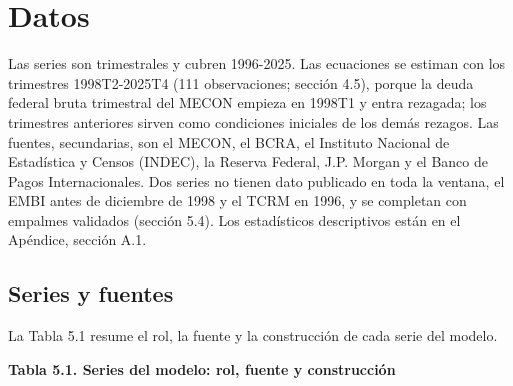 \chapter{Datos}

Las series son trimestrales y cubren 1996-2025. Las ecuaciones se
estiman con los trimestres 1998T2-2025T4 (111 observaciones; sección
4.5), porque la deuda federal bruta trimestral del MECON empieza en
1998T1 y entra rezagada; los trimestres anteriores sirven como
condiciones iniciales de los demás rezagos. Las fuentes, secundarias,
son el MECON, el BCRA, el Instituto Nacional de Estadística y Censos
(INDEC), la Reserva Federal, J.P. Morgan y el Banco de Pagos
Internacionales. Dos series no tienen dato publicado en toda la ventana,
el EMBI antes de diciembre de 1998 y el TCRM en 1996, y se completan con
empalmes validados (sección 5.4). Los estadísticos descriptivos están en
el Apéndice, sección A.1.

\section{Series y fuentes}

La Tabla 5.1 resume el rol, la fuente y la construcción de cada serie
del modelo.

\textbf{Tabla 5.1. Series del modelo: rol, fuente y construcción}

